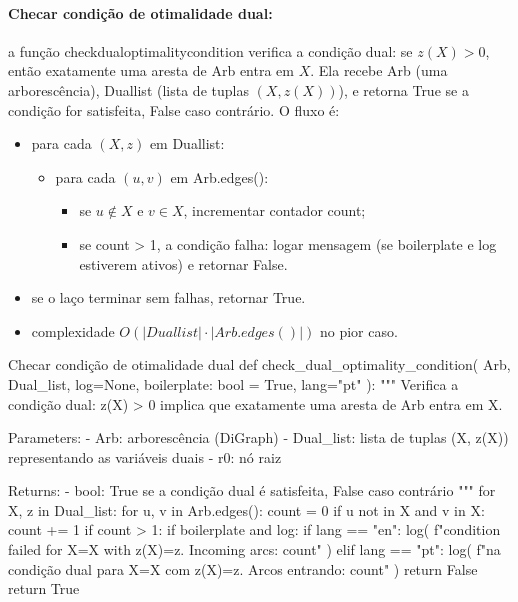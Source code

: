 \documentclass[12pt,a4paper]{article}
\def\texttt#1{#1}%
\def\_{}%
\begin{document}
\paragraph{Checar condição de otimalidade dual:}
    a função \texttt{check\_dual\_optimality\_condition} verifica a condição dual: se \(z(X)>0\), então exatamente uma aresta de \texttt{Arb} entra em \(X\). Ela recebe \texttt{Arb} (uma arborescência), \texttt{Dual\_list} (lista de tuplas \((X,z(X))\)), e retorna True se a condição for satisfeita, False caso contrário. O fluxo é:
\begin{itemize}\setlength{\itemsep}{1pt}
    \item para cada \((X,z)\) em \texttt{Dual\_list}:
    \begin{itemize}\setlength{\itemsep}{1pt}
        \item para cada \((u,v)\) em \texttt{Arb.edges()}:
        \begin{itemize}\setlength{\itemsep}{1pt}
            \item se \(u\notin X\) e \(v\in X\), incrementar contador \texttt{count};
            \item se \texttt{count > 1}, a condição falha: logar mensagem (se \texttt{boilerplate} e \texttt{log} estiverem ativos) e retornar False.
        \end{itemize}
    \end{itemize}
    \item se o laço terminar sem falhas, retornar True.
    \item complexidade \(O(|\texttt{Dual\_list}| \cdot |\texttt{Arb.edges()}|)\) no pior caso.
\end{itemize}

\begin{pybox}{Checar condição de otimalidade dual}
def check_dual_optimality_condition(
    Arb, Dual_list, log=None, boilerplate: bool = True, lang="pt"
):
    """
    Verifica a condição dual: z(X) > 0 implica que exatamente uma aresta de Arb entra em X.

    Parameters:
        - Arb: arborescência (DiGraph)
        - Dual_list: lista de tuplas (X, z(X)) representando as variáveis duais
        - r0: nó raiz

    Returns:
        - bool: True se a condição dual é satisfeita, False caso contrário
    """
    for X, z in Dual_list:
        for u, v in Arb.edges():
            count = 0
            if u not in X and v in X:
                count += 1
                if count > 1:
                    if boilerplate and log:
                        if lang == "en":
                            log(
                                f"\nDual condition failed for X={X} with z(X)={z}. Incoming arcs: {count}"
                            )
                        elif lang == "pt":
                            log(
                                f"\nFalha na condição dual para X={X} com z(X)={z}. Arcos entrando: {count}"
                            )
                    return False
    return True    

\end{pybox}
\end{document}
